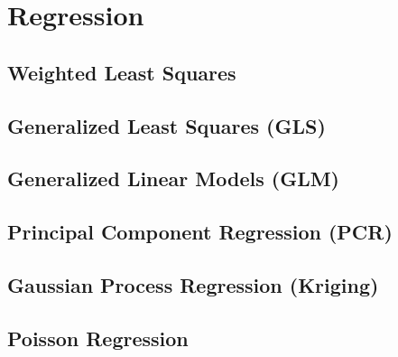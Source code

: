 \section{Regression}
\label{additional:Regression}

\subsection{Weighted Least Squares}
\label{additional:Regression:WLS}

\subsection{Generalized Least Squares (GLS)}
\label{additional:Regression:GLS}

\subsection{Generalized Linear Models (GLM)}
\label{additional:Regression:GLM}

\subsection{Principal Component Regression (PCR)}
\label{additional:Regression:PCR}

\subsection{Gaussian Process Regression (Kriging)}
\label{additional:Regression:kriging}

\subsection{Poisson Regression}
\label{additional:Regression:poisson}

